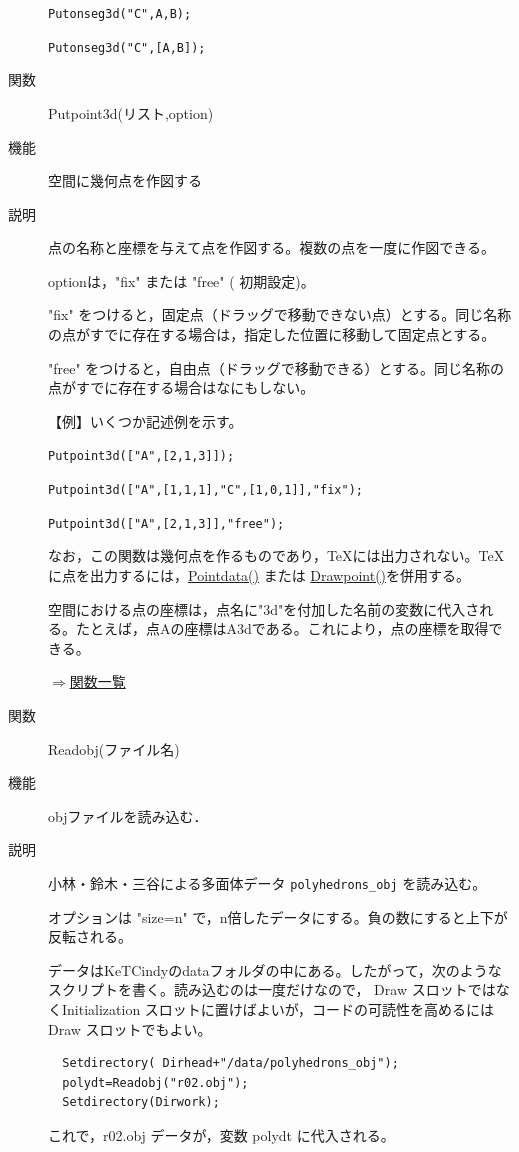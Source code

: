\documentclass[papersize,a4paper,12pt,uplatex]{jsarticle}
\begin{document}
\begin{description}
    \verb|Putonseg3d("C",A,B);|

    \verb|Putonseg3d("C",[A,B]);|
    
\vspace{\baselineskip}

\hypertarget{putpoint3d}{}
\item[関数]  Putpoint3d(リスト,option)
\item[機能]  空間に幾何点を作図する
\item[説明]  点の名称と座標を与えて点を作図する。複数の点を一度に作図できる。

optionは，"fix" または "free" ( 初期設定)。
 
"fix" をつけると，固定点（ドラッグで移動できない点）とする。同じ名称の点がすでに存在する場合は，指定した位置に移動して固定点とする。

"free" をつけると，自由点（ドラッグで移動できる）とする。同じ名称の点がすでに存在する場合はなにもしない。

\vspace{\baselineskip}
【例】いくつか記述例を示す。

    \verb|Putpoint3d(["A",[2,1,3]]);|
    
    \verb|Putpoint3d(["A",[1,1,1],"C",[1,0,1]],"fix");|
    
    \verb|Putpoint3d(["A",[2,1,3]],"free");|
    
\vspace{\baselineskip}
  なお，この関数は幾何点を作るものであり，TeXには出力されない。TeXに点を出力するには，\hyperlink{pointdata}{Pointdata()} または \hyperlink{drwpt}{Drawpoint()}を併用する。
  
  空間における点の座標は，点名に"3d"を付加した名前の変数に代入される。たとえば，点Aの座標はA3dである。これにより，点の座標を取得できる。

\begin{flushright} \hyperlink{functionlist}{$\Rightarrow$関数一覧}\end{flushright}

\vspace{\baselineskip}
\hypertarget{readobj}{}
\item[関数]  Readobj(ファイル名)
\item[機能]  objファイルを読み込む．
\item[説明]  小林・鈴木・三谷による多面体データ \verb|polyhedrons_obj|   を読み込む。

オプションは "size=n"  で，n倍したデータにする。負の数にすると上下が反転される。

データはKeTCindyのdataフォルダの中にある。したがって，次のようなスクリプトを書く。読み込むのは一度だけなので， Draw スロットではなくInitialization スロットに置けばよいが，コードの可読性を高めるには Draw スロットでもよい。
\begin{verbatim}
  Setdirectory( Dirhead+"/data/polyhedrons_obj");
  polydt=Readobj("r02.obj");
  Setdirectory(Dirwork);
\end{verbatim}
これで，r02.obj データが，変数 polydt に代入される。


\end{description}
\end{document}
